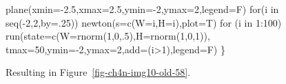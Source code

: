 \documentclass[
  a4paper,
  DIV=11,
  numbers=noendperiod,
  oneside]{scrreprt}
\newenvironment{Shaded}{\begin{snugshade}}{\end{snugshade}}
\newcommand{\AttributeTok}[1]{\textcolor[rgb]{0.40,0.45,0.13}{#1}}
\newcommand{\ControlFlowTok}[1]{\textcolor[rgb]{0.00,0.23,0.31}{#1}}
\newcommand{\DecValTok}[1]{\textcolor[rgb]{0.68,0.00,0.00}{#1}}
\newcommand{\FloatTok}[1]{\textcolor[rgb]{0.68,0.00,0.00}{#1}}
\newcommand{\FunctionTok}[1]{\textcolor[rgb]{0.28,0.35,0.67}{#1}}
\newcommand{\NormalTok}[1]{\textcolor[rgb]{0.00,0.23,0.31}{#1}}
\newcommand{\SpecialCharTok}[1]{\textcolor[rgb]{0.37,0.37,0.37}{#1}}
\begin{document}
\begin{Shaded}
\begin{Highlighting}[]
\FunctionTok{plane}\NormalTok{(}\AttributeTok{xmin=}\SpecialCharTok{{-}}\FloatTok{2.5}\NormalTok{,}\AttributeTok{xmax=}\FloatTok{2.5}\NormalTok{,}\AttributeTok{ymin=}\SpecialCharTok{{-}}\DecValTok{2}\NormalTok{,}\AttributeTok{ymax=}\DecValTok{2}\NormalTok{,}\AttributeTok{legend=}\NormalTok{F)}
\ControlFlowTok{for}\NormalTok{(i }\ControlFlowTok{in} \FunctionTok{seq}\NormalTok{(}\SpecialCharTok{{-}}\DecValTok{2}\NormalTok{,}\DecValTok{2}\NormalTok{,}\AttributeTok{by=}\NormalTok{.}\DecValTok{25}\NormalTok{)) }\FunctionTok{newton}\NormalTok{(}\AttributeTok{s=}\FunctionTok{c}\NormalTok{(}\AttributeTok{W=}\NormalTok{i,}\AttributeTok{H=}\NormalTok{i),}\AttributeTok{plot=}\NormalTok{T)}
\ControlFlowTok{for}\NormalTok{ (i }\ControlFlowTok{in} \DecValTok{1}\SpecialCharTok{:}\DecValTok{100}\NormalTok{)}
  \FunctionTok{run}\NormalTok{(}\AttributeTok{state=}\FunctionTok{c}\NormalTok{(}\AttributeTok{W=}\FunctionTok{rnorm}\NormalTok{(}\DecValTok{1}\NormalTok{,}\DecValTok{0}\NormalTok{,.}\DecValTok{5}\NormalTok{),}\AttributeTok{H=}\FunctionTok{rnorm}\NormalTok{(}\DecValTok{1}\NormalTok{,}\DecValTok{0}\NormalTok{,}\DecValTok{1}\NormalTok{)), }\AttributeTok{tmax=}\DecValTok{50}\NormalTok{,}\AttributeTok{ymin=}\SpecialCharTok{{-}}\DecValTok{2}\NormalTok{,}\AttributeTok{ymax=}\DecValTok{2}\NormalTok{,}\AttributeTok{add=}\NormalTok{(i}\SpecialCharTok{\textgreater{}}\DecValTok{1}\NormalTok{),}\AttributeTok{legend=}\NormalTok{F)}
\NormalTok{\}}
\end{Highlighting}
\end{Shaded}

Resulting in Figure~\ref{fig-ch4n-img10-old-58}.
\end{document}
